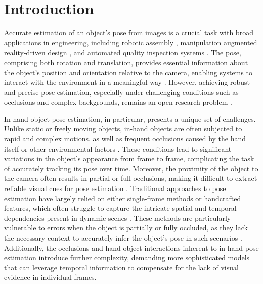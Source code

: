 \section{Introduction}
\label{sec:intro}

Accurate estimation of an object's pose from images is a crucial task with broad applications in engineering, including robotic assembly \cite{trabelsi2021pose, hoang2023grasp, wang2021gdr, hoang2022context}, manipulation \cite{wang2019densefusion, hoang2024collision, zakharov2019dpod, tan2024attention} augmented reality-driven design \cite{billings2019silhonet, hoang2024object, peng2019pvnet, hoang2025attention}, and automated quality inspection systems \cite{marullo20236d, du2021vision, cho2024integration}. The pose, comprising both rotation and translation, provides essential information about the object's position and orientation relative to the camera, enabling systems to interact with the environment in a meaningful way \cite{hoang2024graspability, peng2019pvnet, wang2021gdr, hoang2022voting}. However, achieving robust and precise pose estimation, especially under challenging conditions such as occlusions and complex backgrounds, remains an open research problem \cite{marullo20236d, vu2024occlusion, chen2016innovative}. 

In-hand object pose estimation, in particular, presents a unique set of challenges. Unlike static or freely moving objects, in-hand objects are often subjected to rapid and complex motions, as well as frequent occlusions caused by the hand itself or other environmental factors \cite{chao2021dexycb, hoang2024multi, garcia2018first, llop2022benchmarking}. These conditions lead to significant variations in the object's appearance from frame to frame, complicating the task of accurately tracking its pose over time. Moreover, the proximity of the object to the camera often results in partial or full occlusions, making it difficult to extract reliable visual cues for pose estimation \cite{hoang2016sub, wang20216d, li2019cdpn, hoang2020panoptic}. Traditional approaches to pose estimation have largely relied on either single-frame methods or handcrafted features, which often struggle to capture the intricate spatial and temporal dependencies present in dynamic scenes \cite{billings2019silhonet, peng2019pvnet}. These methods are particularly vulnerable to errors when the object is partially or fully occluded, as they lack the necessary context to accurately infer the object's pose in such scenarios \cite{hoang2019object, trabelsi2021pose, rad2017bb8, hoang2020object}. Additionally, the occlusions and hand-object interactions inherent to in-hand pose estimation introduce further complexity, demanding more sophisticated models that can leverage temporal information to compensate for the lack of visual evidence in individual frames.

